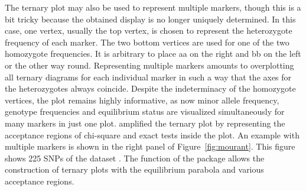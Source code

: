 \documentclass[nojss]{jss}
\begin{document}
The ternary plot may also be used to represent multiple markers,
though this is a bit tricky because the obtained display is no longer
uniquely determined. In this case, one vertex, usually the top vertex,
is chosen to represent the heterozygote frequency of each marker. The
two bottom vertices are used for one of the two homozygote
frequencies. It is arbitrary to place {\sc aa} on the right and {\sc
  bb} on the left or the other way round. Representing multiple
markers amounts to overplotting all ternary diagrams for each
individual marker in such a way that the axes for the heterozygotes
always coincide. Despite the indeterminacy of the homozygote vertices,
the plot remains highly informative, as now minor allele frequency,
genotype frequencies and equilibrium status are visualized
simultaneously for many markers in just one plot. \cite{Graffel18}
amplified the ternary plot by representing the acceptance regions of
chi-square and exact tests inside the plot. An example with multiple
markers is shown in the right panel of Figure~\ref{fig:mourant}. This
figure shows 225 SNPs of the dataset .  The
function  of the package allows the construction
of ternary plots with the equilibrium parabola and various acceptance
regions.  
\end{document}
